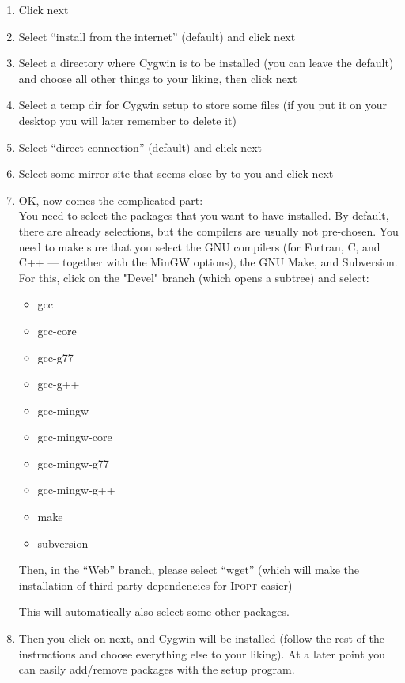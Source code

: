 \documentclass[10pt]{article}
\newcommand{\Ipopt}{\textsc{Ipopt}\xspace}
\begin{document}
\begin{enumerate}
\item Click next
\item Select ``install from the internet'' (default) and click next
\item Select a directory where Cygwin is to be installed (you can
  leave the default) and choose all other things to your liking, then
  click next
\item Select a temp dir for Cygwin setup to store some files (if you
  put it on your desktop you will later remember to delete it)
\item Select ``direct connection'' (default) and click next
\item Select some mirror site that seems close by to you and click next
\item OK, now comes the complicated part:\\
  You need to select the packages that you want to have installed.  By
  default, there are already selections, but the compilers are usually
  not pre-chosen.  You need to make sure that you select the GNU
  compilers (for Fortran, C, and C++ --- together with the MinGW
  options), the GNU Make, and Subversion.  For this, click on the "Devel"
  branch (which opens a subtree) and select:
  \begin{itemize}
  \item gcc
  \item gcc-core
  \item gcc-g77  %
  \item gcc-g++
  \item gcc-mingw
  \item gcc-mingw-core
  \item gcc-mingw-g77
  \item gcc-mingw-g++
  \item make
  \item subversion
  \end{itemize}

  Then, in the ``Web'' branch, please select ``wget'' (which will make
  the installation of third party dependencies for \Ipopt easier)

  This will automatically also select some other packages.
\item\label{it:cyg_done} Then you click on next, and Cygwin will be
  installed (follow the rest of the instructions and choose everything
  else to your liking).  At a later point you can easily add/remove
  packages with the setup program.


\end{enumerate}
\end{document}
